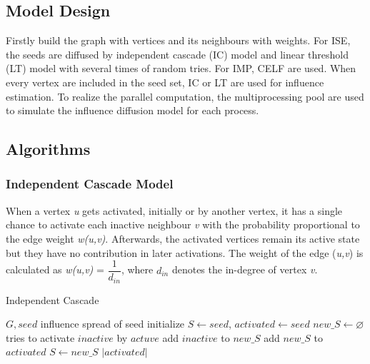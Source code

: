 \documentclass[9pt,shortpaper,twoside,web]{ieeecolor}
\begin{document}
\subsection{Model Design}
Firstly build the graph with vertices and its neighbours with weights. For ISE, the seeds are diffused by independent cascade    (IC) model and linear threshold (LT) model with several times of random tries. For IMP, CELF are used. When every vertex are included in the seed set, IC or LT are used for influence estimation. To realize the parallel computation, the multiprocessing pool are used to simulate the influence diffusion model for each process.

\subsection{Algorithms}
\subsubsection{Independent Cascade Model}
When a vertex \textit{u} gets activated, initially or by another vertex, it has a single chance to activate each inactive neighbour \textit{v} with the probability proportional to the edge weight \textit{w(u,v)}.
Afterwards, the activated vertices remain its active state but they have no contribution in later activations.
The weight of the edge (\textit{u,v}) is calculated as \textit{w(u,v)} =
$\dfrac{1}{d_{in}}$, where $d_{in}$ denotes the in-degree of vertex \textit{v}.
\begin{algorithm}
\caption{Independent Cascade}
\begin{algorithmic} [h]
\renewcommand{\algorithmicrequire}{\textbf{Input:}}
\renewcommand{\algorithmicensure}{\textbf{Output:}}
\REQUIRE $G, seed$
\ENSURE influence spread of seed
\STATE initialize $S \gets seed$, $activated \gets seed$
\STATE $new\_S \gets \varnothing$
\STATE tries to activate $inactive$ by $actuve$
\STATE add $inactive$ to $new\_S$
\ENDIF
\ENDFOR
\ENDFOR
\STATE add $new\_S$ to $activated$
\STATE $S\gets new\_S$
\ENDWHILE
\RETURN $|activated|$
\end{algorithmic}
\end{algorithm}
\end{document}
